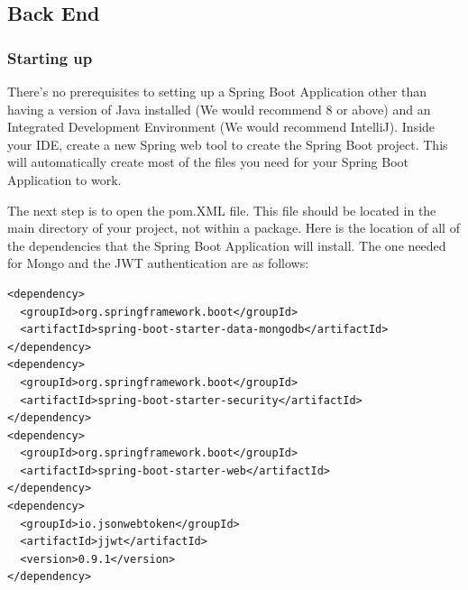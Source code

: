 \subsection{Back End}

\subsubsection{Starting up}
There's no prerequisites to setting up a Spring Boot Application other than having a version of Java installed (We would recommend 8 or above) and an Integrated Development Environment (We would recommend IntelliJ). Inside your IDE, create a new Spring web tool to create the Spring Boot project. This will automatically create most of the files you need for your Spring Boot Application to work. \par
The next step is to open the pom.XML file. This file should be located in the main directory of your project, not within a package. Here is the location of all of the dependencies that the Spring Boot Application will install. The one needed for Mongo and the JWT authentication are as follows: \par
\begin{verbatim}
<dependency>
  <groupId>org.springframework.boot</groupId>
  <artifactId>spring-boot-starter-data-mongodb</artifactId>
</dependency>
<dependency>
  <groupId>org.springframework.boot</groupId>
  <artifactId>spring-boot-starter-security</artifactId>
</dependency>
<dependency>
  <groupId>org.springframework.boot</groupId>
  <artifactId>spring-boot-starter-web</artifactId>
</dependency>
<dependency>
  <groupId>io.jsonwebtoken</groupId>
  <artifactId>jjwt</artifactId>
  <version>0.9.1</version>
</dependency>
\end{verbatim}

